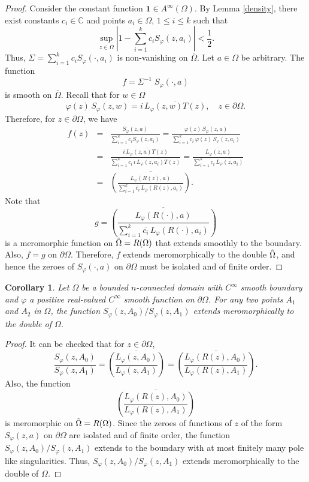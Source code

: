 \documentclass[11pt, reqno]{amsart}
\newtheorem{cor}[thm]{Corollary}
\numberwithin{equation}{section}
\newcommand{\mbb}{\mathbb}
\newcommand{\Om}{\Omega}
\begin{document}
\begin{proof}
Consider the constant function $\mathbf{1}\in A^{\infty}(\Omega)$. By Lemma \ref{density}, there exist constants $c_i\in \mbb C$ and points $a_i\in\Omega$, $1 \le i \le k$ such that
\[
\sup_{z\in\overline{\Om}} \left\lvert 1 - \sum_{i=1}^k c_i S_{\varphi}(z,a_i)\right\rvert < \frac{1}{2}.
\]
Thus, $\Sigma = \sum_{i=1}^k c_i S_{\varphi}(\cdot,a_i)$ is non-vanishing on $\overline{\Omega}$. Let $a\in\Omega$ be arbitrary. The function 
\[
f = \Sigma^{-1} \; S_{\varphi}(\cdot,a)
\]
is smooth on $\overline{\Omega}$. Recall that for $w\in\Omega$
\[
\varphi(z)\, S_{\varphi}(z,w) = i \,\overline{L_{\varphi}(z,w) T(z)}, \quad z\in\partial\Omega.
\]
Therefore, for $z\in\partial\Omega$, we have
\begin{eqnarray*}
f(z) 
&=&
\frac{S_{\varphi}(z,a)}{\sum_{i=1}^k c_i S_{\varphi}(z,a_i)} 
=
\frac{\varphi(z) \, S_{\varphi}(z,a)}{\sum_{i=1}^k c_i\, \varphi(z)\,S_{\varphi}(z,a_i)}
\\ &=&
\frac{i \,\overline{L_{\varphi}(z,a) T(z)}}{\sum_{i=1}^k c_i\, i \,\overline{L_{\varphi}(z,a_i) T(z)}}
=
\frac{\overline{L_{\varphi}(z,a)}}{\sum_{i=1}^k c_i\, \overline{L_{\varphi}(z,a_i)}}\\
&=&
\overline{\left(\frac{L_{\varphi}(R(z),a)}{\sum_{i=1}^k \overline{ c_i}\,L_{\varphi}(R(z),a_i)}\right)}.
\end{eqnarray*}
Note that
\[
g = \overline{\left(\frac{L_{\varphi}(R(\cdot),a)}{\sum_{i=1}^k \overline{ c_i}\,L_{\varphi}(R(\cdot),a_i)}\right)}
\]
is a meromorphic function on $\Tilde{\Omega}=R(\Omega)$ that extends smoothly to the boundary. Also, $f=g$ on $\partial\Omega$. Therefore, $f$ extends meromorphically to the double $\Hat{\Om}$, and hence the zeroes of $S_{\varphi}(\cdot,a)$ on $\partial\Omega$ must be isolated and of finite order.
\end{proof}

\begin{cor}\label{Bell2}
Let $\Omega$ be a bounded $n$-connected domain with $C^{\infty}$ smooth boundary and $\varphi$ a positive real-valued $C^{\infty}$ smooth function on $\partial\Omega$. For any two points $A_1$ and $A_2$ in $\Omega$, the function $S_{\varphi}(z,A_0)/S_{\varphi}(z,A_1)$ extends meromorphically to the double of $\Omega$.
\end{cor}
\begin{proof}
It can be checked that for $z\in\partial\Om$,
\[
\frac{S_{\varphi}(z,A_0)}{S_{\varphi}(z,A_1)}
=
\overline{\left(\frac{L_{\varphi}(z,A_0)}{L_{\varphi}(z,A_1)}\right)} 
=
\overline{\left(\frac{L_{\varphi}(R(z),A_0)}{L_{\varphi}(R(z),A_1)}\right)}.
\]
Also, the function 
\[
\overline{\left(\frac{L_{\varphi}(R(z),A_0)}{L_{\varphi}(R(z),A_1)}\right)}
\]
is meromorphic on $\Tilde{\Om}=R(\Omega)$. Since the zeroes of functions of $z$ of the form $S_{\varphi}(z,a)$ on $\partial\Om$ are isolated and of finite order, the function $S_{\varphi}(z,A_0)/S_{\varphi}(z,A_1)$ extends to the boundary with at most finitely many pole like singularities. Thus, $S_{\varphi}(z,A_0)/S_{\varphi}(z,A_1)$ extends meromorphically to the double of $\Omega$.
\end{proof}
\end{document}
